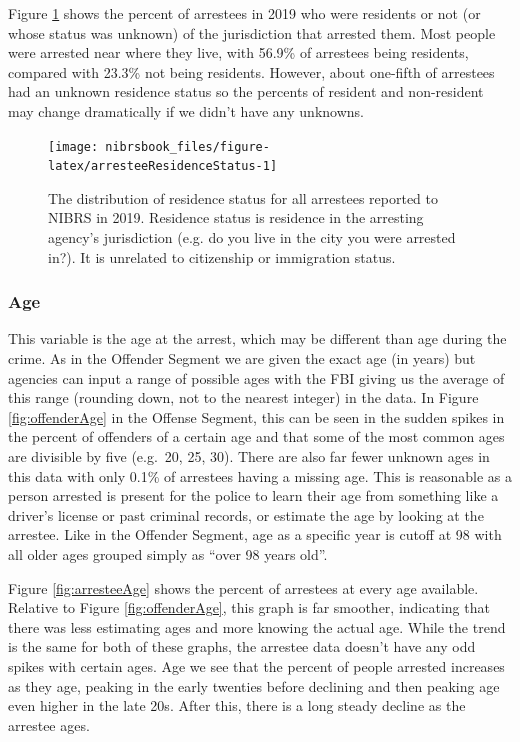 \documentclass[
  12pt,
  openany]{book}
\begin{document}
Figure \ref{fig:arresteeResidenceStatus} shows the percent of arrestees in 2019 who were residents or not (or whose status was unknown) of the jurisdiction that arrested them. Most people were arrested near where they live, with 56.9\% of arrestees being residents, compared with 23.3\% not being residents. However, about one-fifth of arrestees had an unknown residence status so the percents of resident and non-resident may change dramatically if we didn't have any unknowns.

\begin{figure}

{\centering \texttt{[image: nibrsbook\_files/figure-latex/arresteeResidenceStatus-1]} 

}

\caption{The distribution of residence status for all arrestees reported to NIBRS in 2019. Residence status is residence in the arresting agency's jurisdiction (e.g. do you live in the city you were arrested in?). It is unrelated to citizenship or immigration status.}\label{fig:arresteeResidenceStatus}
\end{figure}

\hypertarget{age-2}{%
\subsubsection{Age}\label{age-2}}

This variable is the age at the arrest, which may be different than age during the crime. As in the Offender Segment we are given the exact age (in years) but agencies can input a range of possible ages with the FBI giving us the average of this range (rounding down, not to the nearest integer) in the data. In Figure \ref{fig:offenderAge} in the Offense Segment, this can be seen in the sudden spikes in the percent of offenders of a certain age and that some of the most common ages are divisible by five (e.g.~20, 25, 30). There are also far fewer unknown ages in this data with only 0.1\% of arrestees having a missing age. This is reasonable as a person arrested is present for the police to learn their age from something like a driver's license or past criminal records, or estimate the age by looking at the arrestee. Like in the Offender Segment, age as a specific year is cutoff at 98 with all older ages grouped simply as ``over 98 years old''.

Figure \ref{fig:arresteeAge} shows the percent of arrestees at every age available. Relative to Figure \ref{fig:offenderAge}, this graph is far smoother, indicating that there was less estimating ages and more knowing the actual age. While the trend is the same for both of these graphs, the arrestee data doesn't have any odd spikes with certain ages. Age we see that the percent of people arrested increases as they age, peaking in the early twenties before declining and then peaking age even higher in the late 20s. After this, there is a long steady decline as the arrestee ages.
\end{document}
